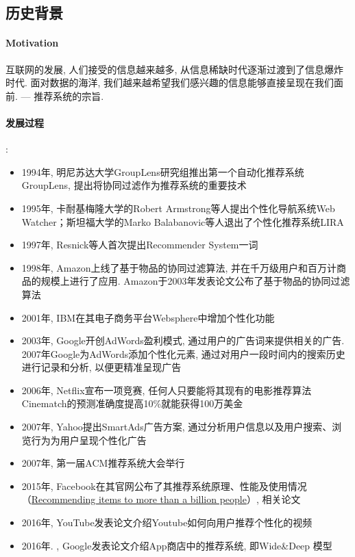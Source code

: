 \subsection{历史背景}
\paragraph{Motivation}互联网的发展, 人们接受的信息越来越多, 从信息稀缺时代逐渐过渡到了信息爆炸时代. 面对数据的海洋, 我们越来越希望我们感兴趣的信息能够直接呈现在我们面前.  --- 推荐系统的宗旨. 

\paragraph{发展过程}: 
\begin{itemize}
	\item 1994年, 明尼苏达大学GroupLens研究组推出第一个自动化推荐系统GroupLens, 提出将协同过滤作为推荐系统的重要技术
	\item 1995年, 卡耐基梅隆大学的Robert Armstrong等人提出个性化导航系统Web Watcher；斯坦福大学的Marko Balabanovic等人退出了个性化推荐系统LIRA
	\item 1997年, Resnick等人首次提出Recommender System一词
 	\item 1998年, Amazon上线了基于物品的协同过滤算法, 并在千万级用户和百万计商品的规模上进行了应用. Amazon于2003年发表论文\cite{linden2003amazon.com}公布了基于物品的协同过滤算法
	\item 2001年, IBM在其电子商务平台Websphere中增加个性化功能
	\item 2003年, Google开创AdWords盈利模式, 通过用户的广告词来提供相关的广告. 2007年Google为AdWords添加个性化元素, 通过对用户一段时间内的搜索历史进行记录和分析, 以便更精准呈现广告
	\item 2006年, Netflix宣布一项竞赛, 任何人只要能将其现有的电影推荐算法Cinematch的预测准确度提高10\%就能获得100万美金
	\item 2007年, Yahoo提出SmartAds广告方案, 通过分析用户信息以及用户搜索、浏览行为为用户呈现个性化广告
	\item 2007年, 第一届ACM推荐系统大会举行
	\item 2015年, Facebook在其官网公布了其推荐系统原理、性能及使用情况（\href{https://engineering.fb.com/2015/06/02/core-data/recommending-items-to-more-than-a-billion-people/}{Recommending items to more than a billion people}）, 相关论文\cite{he2014practical}
	\item 2016年, YouTube发表论文\cite{covington2016deep}介绍Youtube如何向用户推荐个性化的视频
	\item 2016年. , Google发表论文\cite{cheng2016wide}介绍App商店中的推荐系统, 即Wide\&Deep 模型
\end{itemize}

